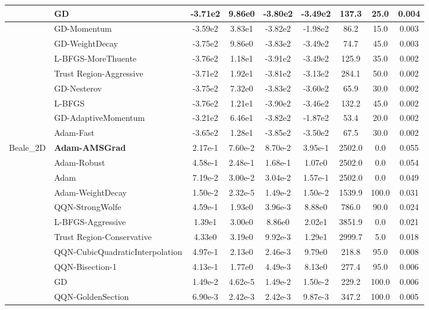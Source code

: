 \documentclass{article}
\begin{document}
\begin{longtable}{|l|l|c|c|c|c|c|c|c|}
\hline
 & GD & -3.71e2 & 9.86e0 & -3.80e2 & -3.49e2 & 137.3 & 25.0 & 0.004 \\
\hline
 & GD-Momentum & -3.59e2 & 3.83e1 & -3.82e2 & -1.98e2 & 86.2 & 15.0 & 0.003 \\
\hline
 & GD-WeightDecay & -3.75e2 & 9.86e0 & -3.83e2 & -3.49e2 & 74.7 & 45.0 & 0.003 \\
\hline
 & L-BFGS-MoreThuente & -3.76e2 & 1.18e1 & -3.91e2 & -3.49e2 & 125.9 & 35.0 & 0.002 \\
\hline
 & Trust Region-Aggressive & -3.71e2 & 1.92e1 & -3.81e2 & -3.13e2 & 284.1 & 50.0 & 0.002 \\
\hline
 & GD-Nesterov & -3.75e2 & 7.32e0 & -3.83e2 & -3.60e2 & 65.9 & 30.0 & 0.002 \\
\hline
 & L-BFGS & -3.76e2 & 1.21e1 & -3.90e2 & -3.46e2 & 132.2 & 45.0 & 0.002 \\
\hline
 & GD-AdaptiveMomentum & -3.21e2 & 6.46e1 & -3.82e2 & -1.87e2 & 53.4 & 20.0 & 0.002 \\
\hline
 & Adam-Fast & -3.65e2 & 1.28e1 & -3.85e2 & -3.50e2 & 67.5 & 30.0 & 0.002 \\
Beale\_2D & \textbf{Adam-AMSGrad} & 2.17e-1 & 7.60e-2 & 8.70e-2 & 3.95e-1 & 2502.0 & 0.0 & 0.055 \\
\hline
 & Adam-Robust & 4.58e-1 & 2.48e-1 & 1.68e-1 & 1.07e0 & 2502.0 & 0.0 & 0.054 \\
\hline
 & Adam & 7.19e-2 & 3.00e-2 & 3.04e-2 & 1.57e-1 & 2502.0 & 0.0 & 0.049 \\
\hline
 & Adam-WeightDecay & 1.50e-2 & 2.32e-5 & 1.49e-2 & 1.50e-2 & 1539.9 & 100.0 & 0.031 \\
\hline
 & QQN-StrongWolfe & 4.59e-1 & 1.93e0 & 3.96e-3 & 8.88e0 & 786.0 & 90.0 & 0.024 \\
\hline
 & L-BFGS-Aggressive & 1.39e1 & 3.00e0 & 8.86e0 & 2.02e1 & 3851.9 & 0.0 & 0.021 \\
\hline
 & Trust Region-Conservative & 4.33e0 & 3.19e0 & 9.92e-3 & 1.29e1 & 2999.7 & 5.0 & 0.018 \\
\hline
 & QQN-CubicQuadraticInterpolation & 4.97e-1 & 2.13e0 & 2.46e-3 & 9.79e0 & 218.8 & 95.0 & 0.008 \\
\hline
 & QQN-Bisection-1 & 4.13e-1 & 1.77e0 & 4.49e-3 & 8.13e0 & 277.4 & 95.0 & 0.006 \\
\hline
 & GD & 1.49e-2 & 4.62e-5 & 1.49e-2 & 1.50e-2 & 229.2 & 100.0 & 0.006 \\
\hline
 & QQN-GoldenSection & 6.90e-3 & 2.42e-3 & 2.42e-3 & 9.87e-3 & 347.2 & 100.0 & 0.005 \\

\end{longtable}
\end{document}
